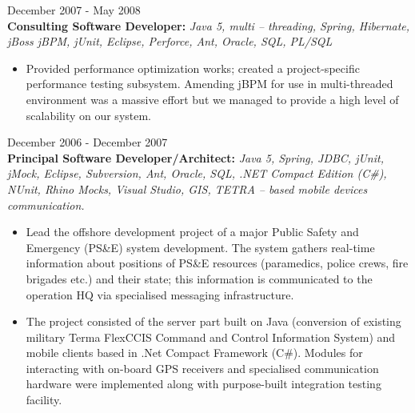 \documentclass{res}
\begin{document}
\begin{resume}
 \hfill        December 2007 - May 2008\\
{\bf Consulting Software Developer:} {\em Java 5, multi – threading, Spring, Hibernate, jBoss jBPM, jUnit, Eclipse, Perforce, Ant, Oracle, SQL, PL/SQL}
\begin{itemize} \itemsep -2pt %
 \item Provided performance optimization works; created a project-specific performance testing subsystem. Amending jBPM for use in multi-threaded environment was a massive effort but we managed to provide a high level of scalability on our system.
\end{itemize}

 \hfill        December 2006 - December 2007\\
{\bf Principal Software Developer/Architect:} {\em Java 5, Spring, JDBC, jUnit, jMock, Eclipse, Subversion, Ant, Oracle, SQL, .NET Compact Edition (C\#), NUnit, Rhino Mocks, Visual Studio, GIS, TETRA – based mobile devices communication.}
\begin{itemize} \itemsep -2pt %
 \item Lead the offshore development project of a major Public Safety and Emergency (PS\&E) system development. The system gathers real-time information about positions of PS\&E resources (paramedics, police crews, fire brigades etc.) and their state; this information is communicated to the operation HQ via specialised messaging infrastructure.
 \item The project consisted of the server part built on Java (conversion of existing military Terma FlexCCIS Command and Control Information System) and mobile clients based in .Net Compact Framework (C\#). Modules for interacting with on-board GPS receivers and specialised communication hardware were implemented along with purpose-built integration testing facility.
\end{itemize}


\end{resume}
\end{document}
